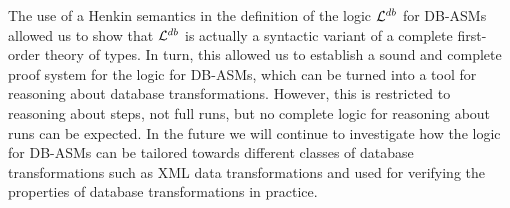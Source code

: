 \documentclass[preprint,11pt]{elsarticle}
\theoremstyle{definition}
\theoremstyle{remark}
\begin{document}
The use of a Henkin semantics in the definition of the logic ${\cal L}^{db}$ for DB-ASMs allowed us to show that ${\cal L}^{db}$ is actually a syntactic variant of a complete first-order theory of types. In turn, this allowed us to establish a sound and complete proof system for the logic for DB-ASMs, which can
be turned into a tool for reasoning about database transformations. However, this is restricted to reasoning about steps, not full runs, but no complete logic for reasoning about runs can be expected.
In the future we will continue to investigate how the logic for
DB-ASMs can be tailored towards different classes of database
transformations such as XML data transformations and used for
verifying the properties of database transformations in practice.



\end{document}
